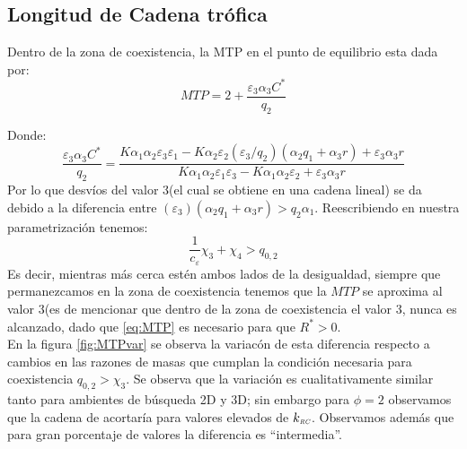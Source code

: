 \subsection{Longitud de Cadena tr\'ofica}

Dentro de la zona de coexistencia, la MTP en el punto de equilibrio esta dada por:
\begin{equation}
  MTP = 2 + \frac{\varepsilon_3 \alpha_3 C^*}{q_2}
\end{equation}

Donde:
\begin{equation}
  \frac{\varepsilon_3 \alpha_3 C^*}{q_2} = \frac{K \alpha_1 \alpha_2 \varepsilon_3 \varepsilon_1 - K \alpha_2 \varepsilon_2 (\varepsilon_3/q_2) (\alpha_2 q_1 + \alpha_3 r) + \varepsilon_3 \alpha_3 r}{ K \alpha_1\alpha_2 \varepsilon_1 \varepsilon_3 - K \alpha_1\alpha_2 \varepsilon_2 + \varepsilon_3 \alpha_3 r}
\end{equation}
Por lo que desv\'ios del valor 3(el cual se obtiene en una cadena lineal) se da debido a la diferencia entre $(\varepsilon_3)(\alpha_2 q_1 + \alpha_3 r) >  q_2 \alpha_1 $. Reescribiendo en nuestra parametrizaci\'on tenemos:
\begin{equation}\label{eq:MTP}
  \frac{1}{c_\varepsilon} \chi_3 + \chi_4  > q_{0,2}
\end{equation}
Es decir, mientras m\'as cerca est\'en ambos lados de la desigualdad, siempre que permanezcamos en la zona de coexistencia tenemos que la $MTP$ se aproxima al valor $3$(es de mencionar que dentro de la zona de coexistencia el valor 3, nunca es alcanzado, dado que \eqref{eq:MTP} es necesario para que $R^* > 0$.\\

En la figura \ref{fig:MTPvar} se observa la variac\'on de esta diferencia respecto a cambios en las razones de masas que cumplan la condici\'on necesaria para coexistencia $q_{0,2} > \chi_3$. Se observa que la variaci\'on es cualitativamente similar tanto para ambientes de b\'usqueda 2D y 3D; sin embargo para $\phi = 2$ observamos que la cadena de acortar\'ia  para valores elevados de $k_{\textit{\tiny RC}}$. Observamos adem\'as que para gran porcentaje de valores la diferencia es ``intermedia''.


